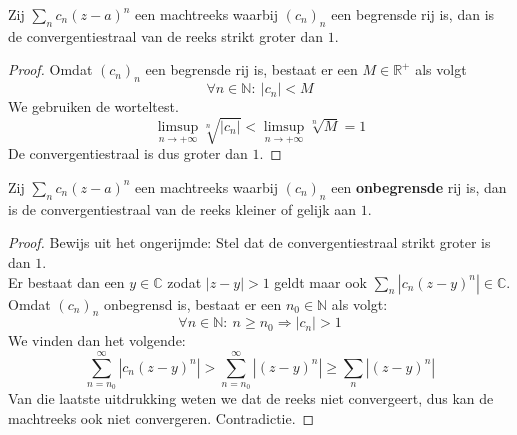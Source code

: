 \documentclass[main.tex]{subfiles}
\begin{document}

\begin{st}
  Zij $\sum_{n}c_{n}(z-a)^{n}$ een machtreeks waarbij $(c_{n})_{n}$ een begrensde rij is, dan is de convergentiestraal van de reeks strikt groter dan $1$.

  \begin{proof}
    Omdat $(c_{n})_{n}$ een begrensde rij is, bestaat er een $M\in\mathbb{R}^{+}$ als volgt
    \[ \forall n\in\mathbb{N}:\ |c_{n}| < M \]
    We gebruiken de worteltest.
    \[ \limsup_{n\rightarrow +\infty}\sqrt[n]{|c_{n}|} < \limsup_{n\rightarrow +\infty}\sqrt[n]{M} = 1 \]
    De convergentiestraal is dus groter dan $1$.
  \end{proof}
\end{st}

\begin{st}
  Zij $\sum_{n}c_{n}(z-a)^{n}$ een machtreeks waarbij $(c_{n})_{n}$ een \textbf{onbegrensde} rij is, dan is de convergentiestraal van de reeks kleiner of gelijk aan $1$.

  \begin{proof}
    Bewijs uit het ongerijmde: Stel dat de convergentiestraal strikt groter is dan $1$.\\
    Er bestaat dan een $y\in \mathbb{C}$ zodat $|z-y| > 1$ geldt maar ook $\sum_{n}|c_{n}(z-y)^{n}| \in\mathbb{C}$.
    Omdat $(c_{n})_{n}$ onbegrensd is, bestaat er een $n_{0}\in\mathbb{N}$ als volgt:
    \[ \forall n\in\mathbb{N}:\ n\ge n_{0} \Rightarrow |c_{n}| > 1 \]
    We vinden dan het volgende:
    \[ \sum_{n=n_{0}}^{\infty}\left|c_{n}(z-y)^{n}\right| > \sum_{n=n_{0}}^{\infty}\left|(z-y)^{n}\right| \ge \sum_{n}\left|(z-y)^{n}\right| \]
    Van die laatste uitdrukking weten we dat de reeks niet convergeert, dus kan de machtreeks ook niet convergeren.
    Contradictie.
  \end{proof}
\end{st}
\end{document}
